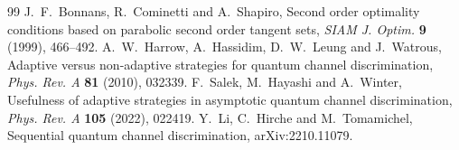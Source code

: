 \begin{thebibliography}{99}
 J.~F.~Bonnans, R.~Cominetti and A.~Shapiro,
Second order optimality conditions based on parabolic second order
tangent sets, \emph{SIAM J. Optim.} \textbf{9} (1999), 466--492.
 A.~W.~Harrow, A.~Hassidim, D.~W.~Leung and J.~Watrous,
Adaptive versus non-adaptive strategies for quantum channel
discrimination, \emph{Phys. Rev. A} \textbf{81} (2010), 032339.
 F.~Salek, M.~Hayashi and A.~Winter,
Usefulness of adaptive strategies in asymptotic quantum channel
discrimination, \emph{Phys. Rev. A} \textbf{105} (2022), 022419.
 Y.~Li, C.~Hirche and M.~Tomamichel,
Sequential quantum channel discrimination, arXiv:2210.11079.
\end{thebibliography}
